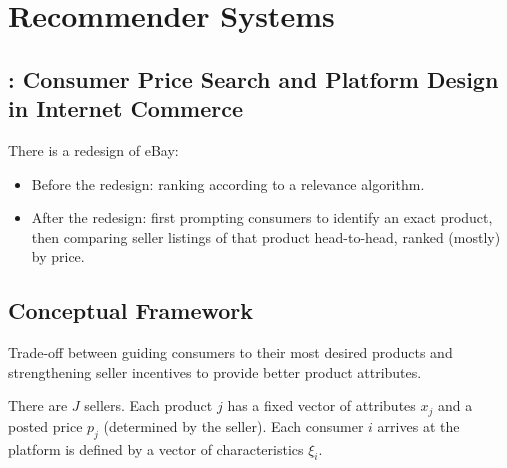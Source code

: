 \chapter{Recommender Systems}
\section{\cite{dinerstein2018consumer}: Consumer Price Search and Platform Design in Internet Commerce}
There is a redesign of eBay:
\begin{itemize}
    \item Before the redesign: ranking according to a relevance algorithm.
    \item After the redesign: first prompting consumers to identify an exact product, then comparing seller listings of that product  head-to-head, ranked (mostly) by price.
\end{itemize}

\section{Conceptual Framework}
Trade-off between guiding consumers to their most desired products and strengthening seller  incentives to provide better product attributes.

There are $J$ sellers. Each product $j$ has a fixed vector of attributes $x_j$ and a posted price $p_j$ (determined by the seller). Each consumer $i$ arrives at the platform is defined by a vector of characteristics $\xi_i$.